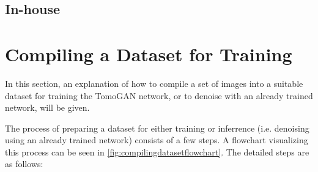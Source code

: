 \subsection{In-house}

\section{Compiling a Dataset for Training}
\label{sec:method:compilingdataset}
In this section, an explanation of how to compile a set of images into a suitable dataset for training the TomoGAN network, or to denoise with an already trained network, will be given. 

The process of preparing a dataset for either training or inferrence (i.e. denoising using an already trained network) consists of a few steps. A flowchart visualizing this process can be seen in \cref{fig:compilingdatasetflowchart}. The detailed steps are as follows:

